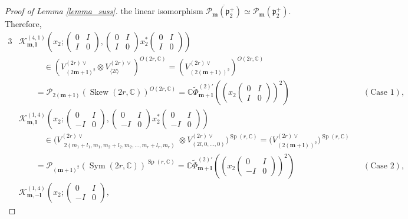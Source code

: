 \documentclass[pdftex]{sigma}
\numberwithin{equation}{section}
\newcommand{\bl}{\mathbf{l}}
\newcommand{\bm}{\mathbf{m}}
\newcommand{\BC}{\mathbb{C}}
\newcommand{\fp}{\mathfrak{p}}
\newcommand{\cK}{\mathcal{K}}
\newcommand{\cP}{\mathcal{P}}
\newcommand{\Sym}{\operatorname{Sym}}
\newcommand{\Skew}{\operatorname{Skew}}
\begin{document}
\begin{proof}[Proof of Lemma \ref{lemma_suss}]
the linear isomorphism $\overline{\cP_\bm(\fp^+_2)}\allowbreak\simeq \cP_\bm(\fp^+_2)$. Therefore,
\begin{alignat*}{3}
&\cK_{\bm,\bl}^{(4,1)}\left(x_2;\begin{pmatrix}0&I\\I&0\end{pmatrix},
\begin{pmatrix}0&I\\I&0\end{pmatrix}x_2^*\begin{pmatrix}0&I\\I&0\end{pmatrix}\right)&&&\\
&\qquad\quad{} \in\left(V_{(2\bm+\bl)^2}^{(2r)\vee}\otimes V_{\langle 2l\rangle}^{(2r)\vee}\right)^{O(2r,\BC)}=\left(V_{(2(\bm+\bl))^2}^{(2r)\vee}\right)^{O(2r,\BC)}&&& \\
&\qquad{} =\cP_{2(\bm+\bl)}(\Skew(2r,\BC))^{O(2r,\BC)}
=\BC\tilde{\Phi}_{\bm+\bl}^{(2)\prime}\left(\left(x_2\begin{pmatrix}0&I\\I&0\end{pmatrix}\right)^2\right) \quad & &(\text{Case }1),& \\
&\cK_{\bm,\bl}^{(1,4)}\left(x_2;\begin{pmatrix}0&I\\-I&0\end{pmatrix},
\begin{pmatrix}0&I\\-I&0\end{pmatrix}x_2^*\begin{pmatrix}0&I\\-I&0\end{pmatrix}\right)&&&\\
&\qquad \quad {} \in\big(V_{\substack{2(m_1+l_1,m_1,m_2+l_2,m_2,\ldots,m_r+l_r,m_r)}}^{(2r)\vee}
\otimes V_{(2l,0,\ldots,0)}^{(2r)\vee}\big)^{\operatorname{Sp}(r,\BC)}
=\big(V_{(2(\bm+\bl))^2}^{(2r)\vee}\big)^{\operatorname{Sp}(r,\BC)}\!\!\! &&& \\
&\qquad {} =\cP_{(\bm+\bl)^2}(\Sym(2r,\BC))^{\operatorname{Sp}(r,\BC)}
=\BC\tilde{\Phi}_{\bm+\bl}^{(2)\prime}\left(\left(x_2\begin{pmatrix}0&I\\-I&0\end{pmatrix}\right)^2\right)\quad & &(\text{Case 2}),& \\
&\cK_{\bm,-\bl}^{(1,4)}\left(x_2;\begin{pmatrix}0&I\\-I&0\end{pmatrix},

\end{alignat*}
\end{proof}
\end{document}

